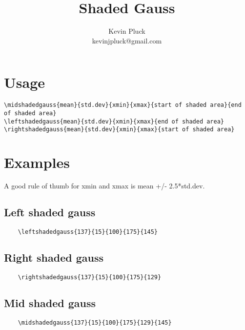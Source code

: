 \documentclass[11pt]{article}
\begin{document}

\title{Shaded Gauss}
\author{Kevin Pluck\\kevinjpluck@gmail.com}
\date{\vspace{-5ex}} %
\maketitle

\section{Usage}
\begin{verbatim}
\midshadedgauss{mean}{std.dev}{xmin}{xmax}{start of shaded area}{end of shaded area}
\leftshadedgauss{mean}{std.dev}{xmin}{xmax}{end of shaded area}
\rightshadedgauss{mean}{std.dev}{xmin}{xmax}{start of shaded area}

\end{verbatim}

\section{Examples}
A good rule of thumb for xmin and xmax is mean +/- 2.5*std.dev.
\subsection{Left shaded gauss}
\begin{verbatim}
	\leftshadedgauss{137}{15}{100}{175}{145}
\end{verbatim}
\subsection{Right shaded gauss}
\begin{verbatim}
	\rightshadedgauss{137}{15}{100}{175}{129}
\end{verbatim}
\subsection{Mid shaded gauss}
\begin{verbatim}
	\midshadedgauss{137}{15}{100}{175}{129}{145}
\end{verbatim}
\end{document}
